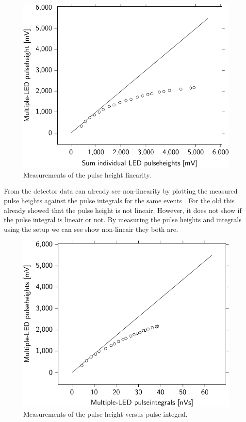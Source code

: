 \begin{figure}
    \centering
    \includegraphics{plots/calibration/linearity_senstech_ph}
    \caption{Measurements of the pulse height linearity.}
    \label{fig:linearity_senstech_ph}
\end{figure}

From the detector data can already see non-linearity by plotting the
measured pulse heights against the pulse integrals for the same events
. For the old \pmts this
already showed that the pulse height is not lineair. However, it does
not show if the pulse integral is lineair or not. By measuring the pulse
heights and integrals using the setup we can see show non-lineair they
both are.

\begin{figure}
    \centering
    \includegraphics{plots/calibration/linearity_senstech_ph_pi}
    \caption{Measurements of the pulse height versus pulse integral.}
    \label{fig:linearity_senstech_ph_pi}
\end{figure}

